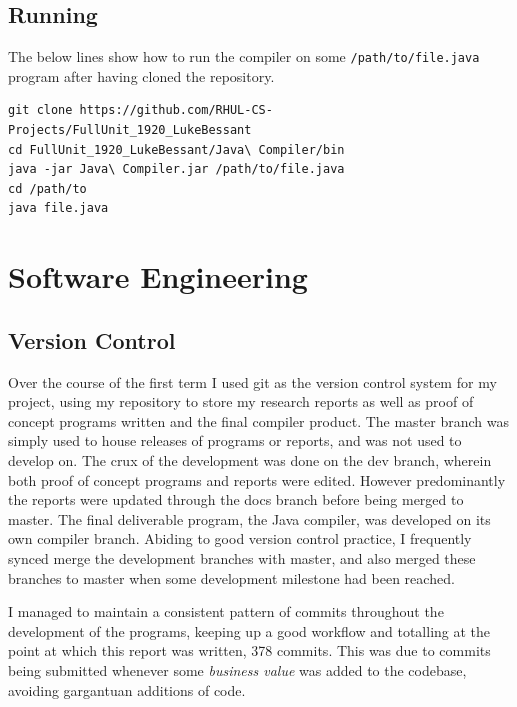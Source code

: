 \documentclass[a4paper, 11pt]{article}
\begin{document}
\subsection{Running}
The below lines show how to run the compiler on some \texttt{/path/to/file.java} program after having cloned the repository.
\begin{verbatim}
git clone https://github.com/RHUL-CS-Projects/FullUnit_1920_LukeBessant
cd FullUnit_1920_LukeBessant/Java\ Compiler/bin
java -jar Java\ Compiler.jar /path/to/file.java
cd /path/to
java file.java
\end{verbatim}



















\newpage\section{Software Engineering}
\subsection{Version Control}
Over the course of the first term I used git as the version control system for my project, using my repository to store my research reports as well as proof of concept programs written and the final compiler product. The master branch was simply used to house releases of programs or reports, and was not used to develop on. The crux of the development was done on the dev branch, wherein both proof of concept programs and reports were edited. However predominantly the reports were updated through the docs branch before being merged to master. The final deliverable program, the Java compiler, was developed on its own compiler branch. Abiding to good version control practice, I frequently synced merge the development branches with master, and also merged these branches to master when some development milestone had been reached. 

I managed to maintain a consistent pattern of commits throughout the development of the programs, keeping up a good workflow and totalling at the point at which this report was written, 378 commits. This was due to commits being submitted whenever some \textit{business value} was added to the codebase, avoiding gargantuan additions of code.
\end{document}
